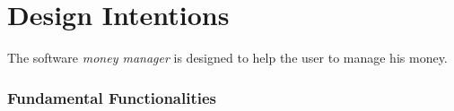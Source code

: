 \part{Design Intentions}
The software \emph{money manager} is designed to help the user to manage his money.

\section{Fundamental Functionalities}
